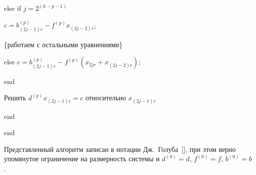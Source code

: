 {\hspace{.5cm}\hspace{.5cm}

else if $j=2^{(k-p-1)}$ 



\hspace{.5cm}\hspace{.5cm}\hspace{.5cm} $ c=b^{(p)}_{(2j-1)r}-f^{(p)}x_{(2j-2)r}$;  



\hspace{.5cm}

\{работаем с остальными уравнениями\}



\hspace{.5cm}\hspace{.5cm} 



\hspace{.5cm}\hspace{.5cm}\hspace{.5cm} else $ c=b^{(p)}_{(2j-1)r}-f^{(p)}(x_{2jr}+x_{(2j-2)r})$;



\hspace{.5cm}\hspace{.5cm}

end



\hspace{.5cm}

Решить $ d^{(p)}x_{(2j-1)r}=c$ относительно $x_{(2j-1)r}$



\hspace{.5cm}

end



end



}



\vspace{3mm}



Представленный алгоритм записан в нотации Дж.~Голуба~[], при этом верно упомянутое ограничение на размерность системы и  $d^{(0)}=d$, $f^{(0)}=f$, $b^{(0)}=b$.






